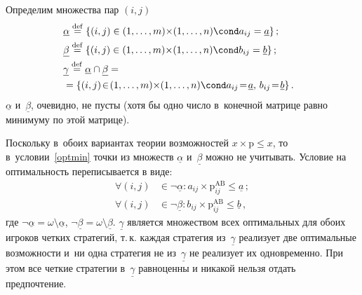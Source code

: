 \documentclass[twoside]{article}
\begin{document}
Определим множества пар $(i,j)$
    \begin{equation}\label{upi}
\hspace*{-7pt}
    \begin{aligned}
&\underline\alpha\stackrel{\mathrm{def}}{=}\left\{(i,j)\in(1,\dots,m){\times}(1,\dots,n)\cond
a_{ij}=\underline a\right\};
    \\
&\underline\beta\stackrel{\mathrm{def}}{=}\left\{(i,j)\in(1,\dots,m){\times}(1,\dots,n)\cond
b_{ij}=\underline b\right\};
    \\
&\underline\gamma\stackrel{\mathrm{def}}{=}\underline\alpha\cap\underline\beta={}
    \\
&=\left\{(i,j)\!\in\!(1,\dots,m){\times}(1,\dots,n)\cond
a_{ij}\!=\!\underline a,\, b_{ij}\!=\!\underline b\right\}.
    \end{aligned}
    \end{equation}
$\underline\alpha$ и~$\underline\beta$, очевидно, не пусты (хотя бы одно число в~конечной матрице
равно минимуму по этой матрице).

Поскольку в~обоих вариантах теории воз\-мож\-ностей $x{\times}\mathrm{p}\le x$, то
в~условии~\eqref{optmin} точки из множеств $\underline\alpha$ и~$\underline\beta$ можно не
учитывать. Условие на оптимальность переписывается в виде:
    \begin{equation}\label{expoptmin}
    \begin{aligned}
\forall(i,j)&\in\neg\underline\alpha\colon
a_{ij}{\times}\mathrm{p}^\mathrm{AB}_{ij}\le\underline a\,;
    \\
\forall(i,j)&\in\neg\underline\beta\colon
b_{ij}{\times}\mathrm{p}^\mathrm{AB}_{ij}\le\underline b\,,
    \end{aligned}
    \end{equation}
где $\neg\underline\alpha=\omega\setminus\underline\alpha$,
$\neg\underline\beta=\omega\setminus\underline\beta$.
$\underline\gamma$ является множеством всех оптимальных для обоих
игроков четких стратегий, т.\,к. каждая стратегия
из~$\underline\gamma$ реализует две оптимальные возможности и~ни
одна стратегия не из~$\underline\gamma$ не реализует их
одновременно. При этом все четкие стратегии в~$\underline\gamma$
равноценны и никакой нельзя отдать предпочтение.
\end{document}
